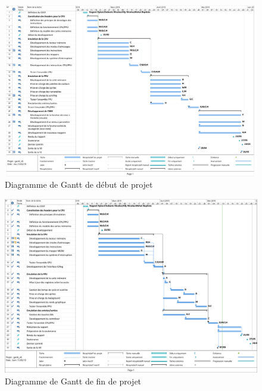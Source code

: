 \begin{figure}[H]
  \centering
   \includegraphics[width=0.90\linewidth]{GanttV1.png}
   \caption{Diagramme de Gantt de début de projet}
   \label{fig:gantt_debut}
\end{figure}

\begin{figure}[H]
  \centering
   \includegraphics[width=0.90\linewidth]{GantV2.png}
   \caption{Diagramme de Gantt de fin de projet}
   \label{fig:gantt_fin}
\end{figure}
